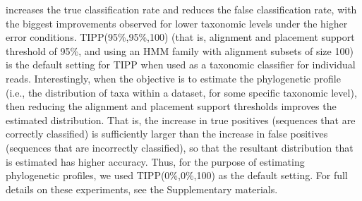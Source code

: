 increases the true classification rate and reduces the
false classification rate, with the 
biggest improvements observed for lower 
taxonomic levels under the higher error conditions.
 TIPP(95\%,95\%,100)
(that is, alignment and placement support threshold of 95\%, and
using an HMM family with alignment subsets of size 100) is
the default setting for TIPP when used as
a taxonomic classifier for individual reads.
Interestingly, when the objective is to estimate
the phylogenetic profile (i.e., the distribution of
taxa within a dataset, for
some specific taxonomic level), then reducing the
alignment and
placement support thresholds improves the estimated distribution.
That is, the increase in true positives (sequences that 
are correctly classified)
is sufficiently larger than the increase in false positives 
(sequences that are incorrectly classified), so that the
resultant distribution that is estimated has higher
accuracy.
Thus, for the purpose of estimating phylogenetic
profiles, we used TIPP(0\%,0\%,100) as the default setting.
For full details on these experiments, see the Supplementary materials.

